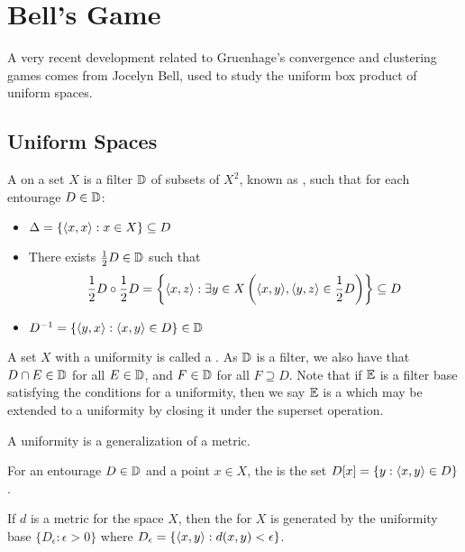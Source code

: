 
\chapter{Bell's Game}

A very recent development related to Gruenhage's convergence and
clustering games comes from
Jocelyn Bell, used to study the uniform box product of uniform spaces.



\section{Uniform Spaces}

\begin{defn}
  A  on a set $X$ is a filter $\mathbb{D}$ of subsets of $X^2$,
  known as , such that for each entourage $D\in\mathbb{D}$:
  \begin{itemize}
    \item $\Delta=\{\langle x,x\rangle:x\in X\}\subseteq D$
    \item There exists $\frac{1}{2}D\in\mathbb{D}$ such that
      \[
        \frac{1}{2}D\circ\frac{1}{2}D
          =
        \left\{\langle x,z\rangle:\exists y\in X\left(\langle x,y\rangle,\langle y,z\rangle\in\frac{1}{2}D\right)\right\}
          \subseteq
        D
      \]
    \item $D^{-1}=\{\langle y,x\rangle:\langle x,y\rangle\in D\}\in \mathbb{D}$
  \end{itemize}
\end{defn}

A set $X$ with a uniformity is called a .
As $\mathbb{D}$ is a filter, we also have that $D\cap E\in \mathbb{D}$ for all
$E\in\mathbb{D}$, and $F\in \mathbb{D}$ for all $F\supseteq D$. Note that if $\mathbb{E}$ is
a filter base satisfying the conditions for a uniformity, then we say
$\mathbb{E}$ is a  which may be extended to a uniformity by
closing it under the superset operation.

A uniformity is a generalization of a metric.

\begin{defn}
  For an entourage $D\in\mathbb{D}$ and a point $x\in X$, the
   is the set $D[x]=\{y:\langle x,y\rangle\in D\}$.
\end{defn}

\begin{defn}
  If $d$ is a metric for the space $X$, then the  for
  $X$ is generated by the uniformity base $\{D_\epsilon:\epsilon>0\}$
  where $D_\epsilon = \{\langle x,y\rangle:d(x,y)<\epsilon\}$.
\end{defn}

